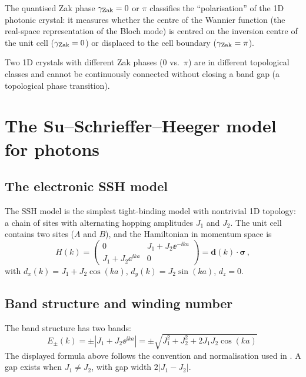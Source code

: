 The quantised Zak phase $\gamma_{\mathrm{Zak}}=0$ or $\pi$ classifies the
``polarisation'' of the 1D photonic crystal: it measures whether the
centre of the Wannier function (the real-space representation of the
Bloch mode) is centred on the inversion centre of the unit cell
($\gamma_{\mathrm{Zak}}=0$) or displaced to the cell boundary ($\gamma_{\mathrm{Zak}}=\pi$).

Two 1D crystals with different Zak phases ($0$ vs.\ $\pi$) are in
different topological classes and cannot be continuously connected
without closing a band gap (a topological phase transition).

\section{The Su--Schrieffer--Heeger model for photons}
\label{sec:ch14-ssh}

\subsection{The electronic SSH model}
\label{sec:ch14-ssh-electronic}

The SSH model is the simplest tight-binding model with nontrivial 1D
topology: a chain of sites with alternating hopping amplitudes $J_1$
and $J_2$.  The unit cell contains two sites ($A$ and $B$), and the
Hamiltonian in momentum space is
\begin{equation}\label{eq:ch14-ssh-hamiltonian}
  H(k) = \begin{pmatrix} 0 & J_1+J_2\ee^{-\ii ka} \\
  J_1+J_2\ee^{\ii ka} & 0 \end{pmatrix}
  = \mathbf{d}(k)\cdot\boldsymbol{\sigma}\,,
\end{equation}
with $d_x(k)=J_1+J_2\cos(ka)$, $d_y(k)=J_2\sin(ka)$, $d_z=0$.

\subsection{Band structure and winding number}
\label{sec:ch14-ssh-bands}

The band structure has two bands:
\begin{equation}\label{eq:ch14-ssh-bands}
  E_\pm(k) = \pm|J_1+J_2\ee^{\ii ka}|
  = \pm\sqrt{J_1^2+J_2^2+2J_1J_2\cos(ka)}\,
\end{equation}
The displayed formula above follows the convention and normalisation used in \cite{kane2005cond}.
A gap exists when $J_1\neq J_2$, with gap width $2|J_1-J_2|$.

